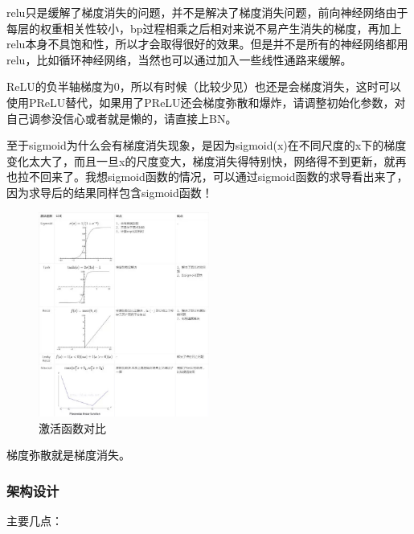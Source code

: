 \begin{itemize}
relu只是缓解了梯度消失的问题，并不是解决了梯度消失问题，前向神经网络由于每层的权重相关性较小，bp过程相乘之后相对来说不易产生消失的梯度，再加上relu本身不具饱和性，所以才会取得很好的效果。但是并不是所有的神经网络都用relu，比如循环神经网络，当然也可以通过加入一些线性通路来缓解。

ReLU的负半轴梯度为0，所以有时候（比较少见）也还是会梯度消失，这时可以使用PReLU替代，如果用了PReLU还会梯度弥散和爆炸，请调整初始化参数，对自己调参没信心或者就是懒的，请直接上BN。

至于sigmoid为什么会有梯度消失现象，是因为sigmoid(x)在不同尺度的x下的梯度变化太大了，而且一旦x的尺度变大，梯度消失得特别快，网络得不到更新，就再也拉不回来了。我想sigmoid函数的情况，可以通过sigmoid函数的求导看出来了，因为求导后的结果同样包含sigmoid函数！

\end{itemize}

\begin{figure}[!hbtp]
\centering
\includegraphics[width=0.5\textwidth]{DLTips/ActivationFunctions0.jpg}
\caption{激活函数对比}
\label{ActivationFunctions0}
\end{figure}

梯度弥散就是梯度消失。

\subsubsection{架构设计}

主要几点：

